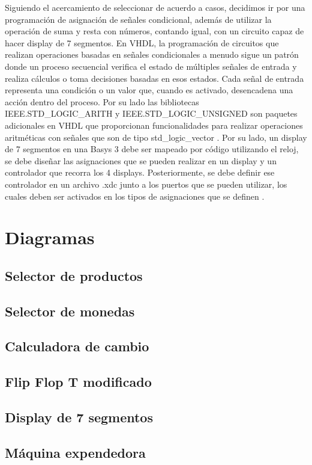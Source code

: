 \documentclass[12pt]{article}  %
\begin{document}
Siguiendo el acercamiento de seleccionar de acuerdo a casos, decidimos ir por una programación de asignación de señales condicional, además de utilizar la operación de suma y resta con números, contando igual, con un circuito capaz de hacer display de 7 segmentos. En VHDL, la programación de circuitos que realizan operaciones basadas en señales condicionales a menudo sigue un patrón donde un proceso secuencial verifica el estado de múltiples señales de entrada y realiza cálculos o toma decisiones basadas en esos estados. Cada señal de entrada representa una condición o un valor que, cuando es activado, desencadena una acción dentro del proceso. Por su lado las bibliotecas IEEE.STD\_LOGIC\_ARITH y IEEE.STD\_LOGIC\_UNSIGNED son paquetes adicionales en VHDL que proporcionan funcionalidades para realizar operaciones aritméticas con señales que son de tipo std\_logic\_vector \cite{unlp2018}. Por su lado, un display de 7 segmentos en una Basys 3 debe ser mapeado por código utilizando el reloj, se debe diseñar las asignaciones que se pueden realizar en un display y un controlador que recorra los 4 displays. Posteriormente, se debe definir ese controlador en un archivo .xdc junto a los puertos que se pueden utilizar, los cuales deben ser activados en los tipos de asignaciones que se definen \cite{digilent2023}.

\section{Diagramas}
\subsection{Selector de productos}
\subsection{Selector de monedas}
\subsection{Calculadora de cambio}
\subsection{Flip Flop T modificado}
\subsection{Display de 7 segmentos}
\subsection{Máquina expendedora}
\end{document}
